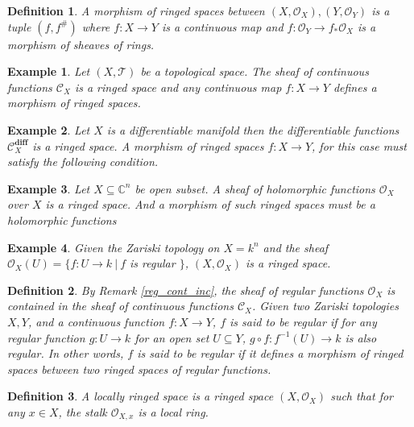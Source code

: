 \documentclass{article}
\newtheorem{definition}{Definition}[section]
\newtheorem{example}{Example}[section]
\numberwithin{equation}{section}
\begin{document}
\begin{definition}
A morphism of ringed spaces between $(X,\mathcal{O}_X),(Y,\mathcal{O}_Y)$ is a tuple $(f,f^{\#})$ where $f:X\to Y$ is a continuous map and $f:\mathcal{O}_Y\to f_*\mathcal{O}_X$ is a morphism of sheaves of rings. 
\end{definition}

\begin{example}
Let $(X,\mathcal{T})$ be a topological space. The sheaf of continuous functions $\mathcal{C}_X$ is a ringed space and any continuous map $f:X\to Y$ defines a morphism of ringed spaces.

\end{example}
\begin{example}
Let $X$ is a differentiable manifold then the differentiable functions $\mathcal{C}^{\mathbf{diff}}_X$ is a ringed space. A morphism of ringed spaces $f:X\to Y$, for this case must satisfy the following condition.
\end{example}

\begin{example}
Let $X\subseteq\mathbb{C}^n$ be open subset. A sheaf of holomorphic functions $\mathcal{O}_X$ over $X$ is a ringed space. And a morphism of such ringed spaces must be a holomorphic functions
\end{example}

\begin{example}
Given the Zariski topology on $X=k^n$ and the sheaf $\mathcal{O}_X(U) = \{f:U\to k\:|\: f$ is regular $\}$, $(X,\mathcal{O}_X)$ is a ringed space.
\end{example}

\begin{definition}
By Remark \ref{reg_cont_inc}, the sheaf of regular functions $\mathcal{O}_X$ is contained in the sheaf of continuous functions $\mathcal{C}_X$. Given two Zariski topologies $X,Y$, and a continuous function $f:X\to Y$, $f$ is said to be regular if 
for any regular function $g:U\to k$ for an open set $U\subseteq Y$, $g\circ f:f^{-1}(U)\to k$ is also regular. In other words, $f$ is said to be regular if it defines a morphism of ringed spaces between two ringed spaces of regular functions. 
\end{definition}

\begin{definition}
A locally ringed space is a ringed space $(X,\mathcal{O}_X)$ such that for any $x\in X$, the stalk $\mathcal{O}_{X,x}$ is a local ring.
\end{definition}
\end{document}
